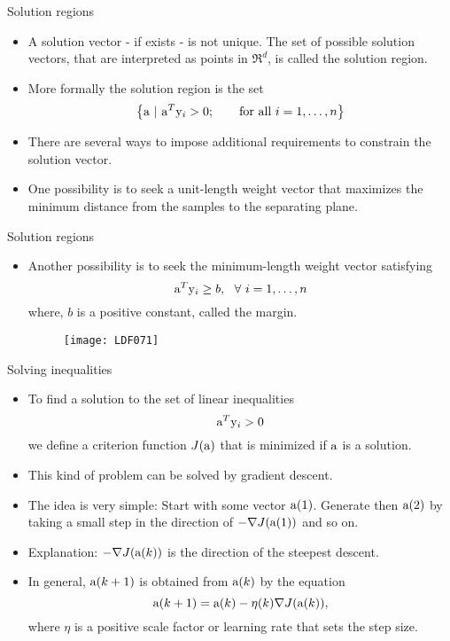 \begin{frame}{Solution regions}
\begin{itemize}
\item A {\color{mycolor2}solution vector} - if exists - is not unique. The set of possible solution vectors, that are interpreted as points
in $\Re^d$, is called the {\color{mycolor4}solution region}.
\item More formally the solution region is the set
\[\left\{ {{\rm a} ~|~{{\rm a}^T}{{\rm y}_i} > 0;~~~~~\text{  for all  } i = 1, \ldots ,n} \right\}\]
\item There are several ways to impose additional requirements to constrain the solution vector. 
\item One possibility is to seek a unit-length weight vector that maximizes the minimum distance from the samples to the separating plane.

\end{itemize}
\end{frame}

\begin{frame}{Solution regions}
\begin{itemize}
\item Another possibility is to seek the minimum-length weight vector satisfying
\[{\rm a}^T {\rm y}_i \geq b,~~\forall~ i= 1,\ldots,n\]
where, $b$  is a positive constant, called the {\color{mycolor2}margin}.
\begin{figure}
\texttt{[image: LDF071]}
\end{figure}
\end{itemize}
\end{frame}

\begin{frame}{Solving inequalities}
\begin{itemize}
\item To find a solution to the set of linear inequalities
\[{\rm a}^T{\rm y}_i > 0\]
we define a criterion function $J({\rm a})$ that is minimized if ${\rm a}$ is a solution.
\item This kind of problem can be solved by {\color{mycolor2}gradient descent}.
\item The idea is very simple: Start with some vector ${\rm a}(1)$.
Generate then ${\rm a}(2)$ by taking a small step in the
direction of $-\nabla J({\rm a}(1))$ and so on.
\item Explanation: $-\nabla J({\rm a}(k))$ is the direction of the steepest descent.
\item In general, ${\rm a}(k + 1)$ is obtained from ${\rm a}(k)$ by the equation
\[{\rm a}(k + 1) = {\rm a}(k)-\eta (k)\nabla J({\rm a}(k)),\]
where $\eta$ is a positive scale factor or {\color{mycolor2}learning rate} that sets the step size.
\end{itemize}
\end{frame}

